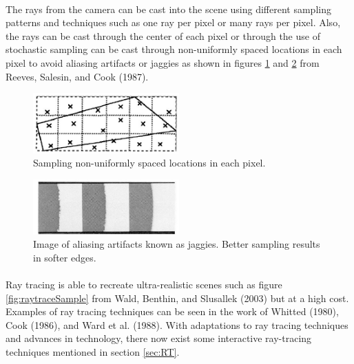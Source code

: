 \paragraph{}
The rays from the camera can be cast into the scene using different sampling patterns and techniques such as one ray per pixel or many rays per pixel.  Also, the rays can be cast through the center of each pixel or through the use of stochastic sampling can be cast through non-uniformly spaced locations in each pixel to avoid aliasing artifacts or jaggies as shown in figures \ref{fig:sampling} and \ref{fig:jaggies} from Reeves, Salesin, and Cook (1987).

\begin{figure}[h!]
  \centering
    \includegraphics[width=0.5\textwidth]{sampling.jpg}
  \caption{Sampling non-uniformly spaced locations in each pixel.}
	\label{fig:sampling}
\end{figure}

\begin{figure}[h!]
  \centering
    \includegraphics[width=0.5\textwidth]{jaggies.jpg}
  \caption{Image of aliasing artifacts known as jaggies. Better sampling results in softer edges.}
	\label{fig:jaggies}
\end{figure}

\paragraph{}
Ray tracing is able to recreate ultra-realistic scenes such as figure \ref{fig:raytraceSample} from Wald, Benthin, and Slusallek (2003) but at a high cost.  Examples of ray tracing techniques can be seen in the work of Whitted (1980), Cook (1986), and Ward et al. (1988).  With adaptations to ray tracing techniques and advances in technology, there now exist some interactive ray-tracing techniques mentioned in section \ref{sec:RT}.

